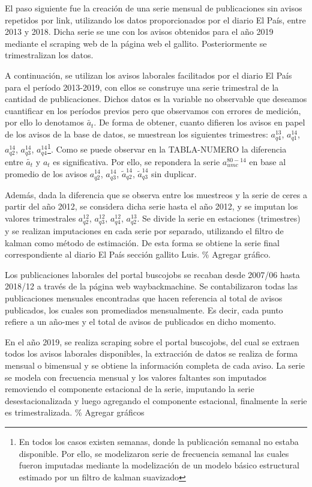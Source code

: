 \documentclass[msc,oneside,a4paper]{udelar} %
\begin{document}
  El paso siguiente fue la creación de una serie mensual de publicaciones sin avisos repetidos por link, utilizando los datos proporcionados por el diario El País, entre 2013 y 2018. Dicha serie se une con los avisos obtenidos para el año 2019 mediante el scraping web de la página web el gallito. Posteriormente se trimestralizan los datos.
  
  A continuación, se utilizan los avisos laborales facilitados por el diario El País para el período 2013-2019, con ellos se construye una serie trimestral de la cantidad de publicaciones.
  Dichos datos es la variable no observable que deseamos cuantificar en los períodos previos pero que observamos con errores de medición, por ello lo denotamos \(\tilde{a_t}\). De forma de obtener, cuanto difieren los avisos en papel de los avisos de la base de datos, se muestrean los siguientes trimestres: \(a_{q4}^{13}\), \(a_{q1}^{14}\), \(a_{q2}^{14}\), \(a_{q3}^{14}\), \(a_{q4}^{14}\)\footnote{En todos los casos existen semanas, donde la publicación semanal no estaba disponible. Por ello, se modelizaron serie de frecuencia semanal las cuales fueron imputadas mediante la modelización de un modelo básico estructural estimado por un filtro de kalman suavizado}. Como se puede observar en la TABLA-NUMERO la diferencia entre \(\tilde{a_t}\) y \({a_t}\) es significativa. Por ello, se repondera la serie \(a_{umc}^{80-14}\) en base al promedio de los avisos \(a_{q2}^{14}\), \(a_{q3}^{14}\), \(\tilde{a}_{q2}^{14}\), \(\tilde{a}_{q3}^{14}\) sin duplicar.
  
  Además, dada la diferencia que se observa entre los muestreos y la serie de ceres a partir del año 2012, se considera dicha serie hasta el año 2012, y se imputan los valores trimestrales \(a_{q2}^{12}\), \(a_{q3}^{12}\), \(a_{q4}^{12}\), \(a_{q2}^{13}\). Se divide la serie en estaciones (trimestres) y se realizan imputaciones en cada serie por separado, utilizando el filtro de kalman como método de estimación. De esta forma se obtiene la serie final correspondiente al diario El País sección gallito Luis.
  \% Agregar gráfico.
  
  Los publicaciones laborales del portal buscojobs se recaban desde 2007/06 hasta 2018/12 a través de la página web waybackmachine. Se contabilizaron todas las publicaciones mensuales encontradas que hacen referencia al total de avisos publicados, los cuales son promediados mensualmente. Es decir, cada punto refiere a un año-mes y el total de avisos de publicados en dicho momento.
  
  En el año 2019, se realiza scraping sobre el portal buscojobs, del cual se extraen todos los avisos laborales disponibles, la extracción de datos se realiza de forma mensual o bimensual y se obtiene la información completa de cada aviso.
  La serie se modela con frecuencia mensual y los valores faltantes son imputados removiendo el componente estacional de la serie, imputando la serie desestacionalizada y luego agregando el componente estacional, finalmente la serie es trimestralizada.
  \% Agregar gráficos
  
\end{document}
